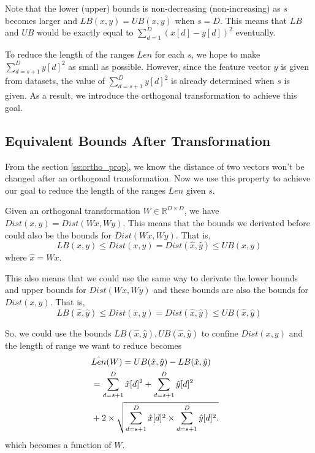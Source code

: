 Note that the lower (upper) bounds is non-decreasing (non-increasing) as $s$ becomes larger and $LB(x,y)=UB(x,y)$ when $s=D$.  This means that $LB$ and $UB$ would be exactly equal to $\sum^D_{d=1}{(x[d]-y[d])^2}$ eventually.

To reduce the length of the ranges $Len$ for each $s$, we hope to make $\sum^D_{d=s+1}{y[d]^2}$ as small as possible.  However, since the feature vector $y$ is given from datasets, the value of $\sum^D_{d=s+1}{y[d]^2}$ is already  determined when $s$ is given.  As a result, we introduce the orthogonal transformation to achieve this goal.



\subsection{Equivalent Bounds After Transformation} %
\label{sub:equivalent_bounds_after_transformation}

From the section \ref{ss:ortho_prop}, we know the distance of two vectors won't be changed after an orthogonal transformation.  Now we use this property to achieve our goal to reduce the length of the ranges $Len$ given $s$.

Given an orthogonal transformation $W\in\mathbb{R}^{D\times D}$, we have $Dist(x,y)=Dist(Wx,Wy)$.  This means that the bounds we derivated before could also be the bounds for $Dist(Wx,Wy)$.  That is,
\[
LB(x,y)\leq Dist(x,y)=Dist(\hat{x},\hat{y}) \leq UB(x,y)
\]
where $\hat{x}=Wx$.

This also means that we could use the same way to derivate the lower bounds and upper bounds for $Dist(Wx,Wy)$ and these bounds are also the bounds for $Dist(x,y)$.  That is,
\[
LB(\hat{x},\hat{y})\leq Dist(x,y)=Dist(\hat{x},\hat{y}) \leq UB(\hat{x},\hat{y})
\]

So, we could use the bounds $LB(\hat{x},\hat{y}),UB(\hat{x},\hat{y})$ to confine $Dist(x,y)$ and the length of range we want to reduce becomes
{
\begin{eqnarray*}
\lefteqn{\hat{Len}(W) = UB(\hat{x},\hat{y}) - LB(\hat{x},\hat{y})} \\
& = \sum^D_{d=s+1}{\hat{x}[d]^2}+\sum^D_{d=s+1}{\hat{y}[d]^2} \notag \\
& +  2 \times \sqrt{\sum^D_{d=s+1}{\hat{x}[d]^2}\times \sum^D_{d=s+1}{\hat{y}[d]^2}.}\label{eq:len-range-hat}
\end{eqnarray*}
}
which becomes a function of $W$.

